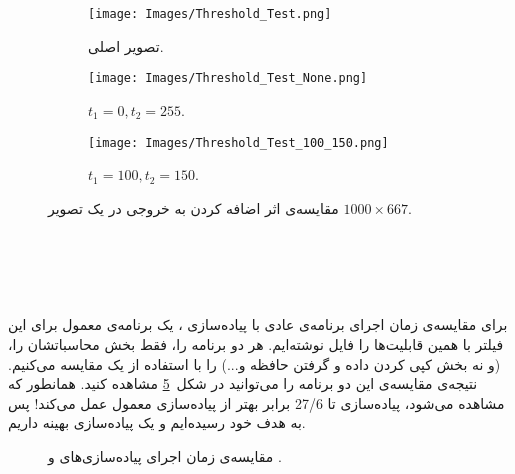 \documentclass[12pt,onecolumn,a4paper]{article}
\begin{document}
\begin{figure}
     \centering
     \begin{subfigure}[b]{0.3\textwidth}
         \centering
         \texttt{[image: Images/Threshold\_Test.png]}
         \caption{تصویر اصلی.}
         \label{Figure:Threshold_Test_Original}
     \end{subfigure}
     \hfill
     \begin{subfigure}[b]{0.3\textwidth}
         \centering
         \texttt{[image: Images/Threshold\_Test\_None.png]}
         \caption{$t_1=0, t_2=255$.}
         \label{Figure:Threshold_Test_None}
     \end{subfigure}
     \hfill
     \begin{subfigure}[b]{0.3\textwidth}
         \centering
         \texttt{[image: Images/Threshold\_Test\_100\_150.png]}
         \caption{$t_1=100, t_2=150$.}
         \label{Figure:Threshold_Test_100_150}
     \end{subfigure}
\caption{مقایسه‌ی اثر اضافه کردن  به خروجی در یک تصویر $1000 \times 667$.}
\label{Figure:Threshold_Test}
\end{figure}

\section{‌}
برای مقایسه‌ی زمان اجرای برنامه‌ی عادی  با پیاده‌سازی ، یک برنامه‌ی معمول برای این فیلتر با همین قابلیت‌ها را فایل  نوشته‌ایم. هر دو برنامه را، فقط بخش محاسباتشان را، (و نه بخش کپی کردن داده و گرفتن حافظه و...) را با استفاده از یک  مقایسه می‌کنیم. نتیجه‌ی مقایسه‌ی این دو برنامه را می‌توانید در شکل~\ref{Figure:Speed_Comparison} مشاهده کنید. همانطور که مشاهده می‌شود، پیاده‌سازی  تا 27/6 برابر بهتر از پیاده‌سازی معمول  عمل می‌کند! پس به هدف خود رسیده‌ایم و یک پیاده‌سازی بهینه داریم.

\begin{figure}
\centering
{}
\caption{مقایسه‌ی زمان اجرای پیاده‌سازی‌های  و .}
\label{Figure:Speed_Comparison}
\end{figure}
\end{document}

